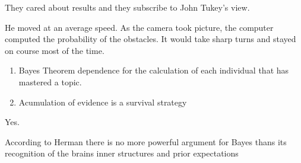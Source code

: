 \documentclass[12pt]{article}
\begin{document}

\begin{enumerate}

\begin{flushleft}
  They cared about results and they subscribe to John Tukey's view.
\end{flushleft}

\begin{flushleft}
    He moved at an average speed. As the camera took picture, the computer computed the probability of the obstacles. It would take sharp turns and 
    stayed on course most of the time.
\end{flushleft}

\begin{enumerate}
    \item Bayes Theorem dependence for the calculation of each individual that has mastered a topic. 
    \item Acumulation of evidence is a survival strategy
\end{enumerate}

\begin{flushleft}
    Yes.
\end{flushleft}

\begin{flushleft}
    According to Herman there is no more powerful argument for Bayes thans its recognition of the brains inner structures and prior expectations
\end{flushleft}

\end{enumerate}




\end{document}
